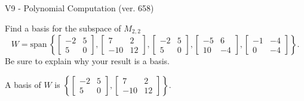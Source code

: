 \begin{exercise}
  \begin{exerciseTitle}V9 - Polynomial Computation (ver. 658)\end{exerciseTitle}
  \begin{exerciseStatement}
    Find a basis for the subspace of \(M_{2,2}\) 
\[W=\mathrm{span}\ \left\{\left[\begin{array}{cc}
-2 & 5 \\
5 & 0
\end{array}\right] , \left[\begin{array}{cc}
7 & 2 \\
-10 & 12
\end{array}\right] , \left[\begin{array}{cc}
-2 & 5 \\
5 & 0
\end{array}\right] , \left[\begin{array}{cc}
-5 & 6 \\
10 & -4
\end{array}\right] , \left[\begin{array}{cc}
-1 & -4 \\
0 & -4
\end{array}\right]\right\}.\]
 Be sure to explain why your result is a basis.


  \end{exerciseStatement}
  \begin{exerciseAnswer}
   A basis of \(W\) is  \(\left\{\left[\begin{array}{cc}
-2 & 5 \\
5 & 0
\end{array}\right] , \left[\begin{array}{cc}
7 & 2 \\
-10 & 12
\end{array}\right]\right\}\).
  


  \end{exerciseAnswer}
\end{exercise}
